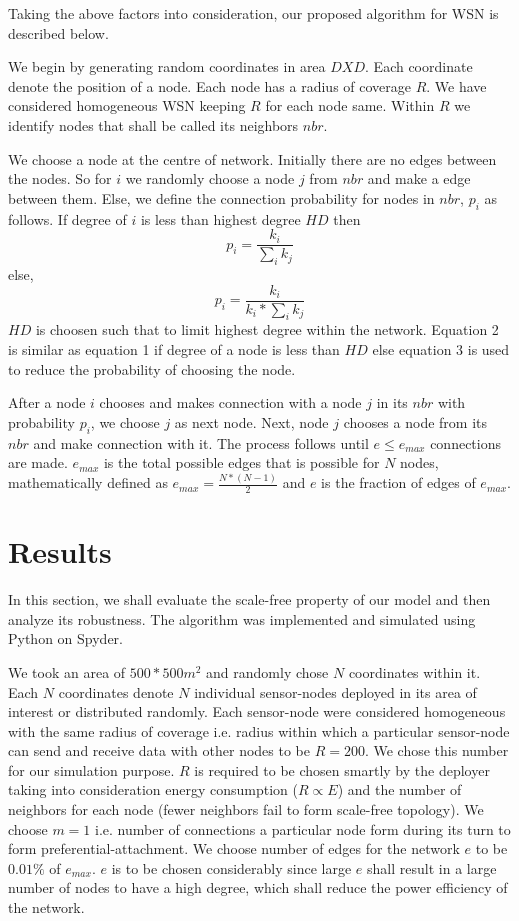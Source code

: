 \documentclass{article}
\begin{document}
	Taking the above factors into consideration, our proposed algorithm for WSN is described below.
	
	We begin by generating random coordinates in area $DXD$. Each coordinate denote the position of a node. Each node has a radius of coverage $R$. We have considered homogeneous WSN keeping $R$ for each node same. Within $R$ we identify nodes that shall be called its neighbors $nbr$. 
	
	We choose a node at the centre of network. Initially there are no edges between the nodes. So for $i$ we randomly choose a node $j$ from $nbr$ and make a edge between them. Else, we define the connection probability for nodes in $nbr$, $p_i$ as follows. If degree of $i$ is less than highest degree $HD$ then \begin{equation} p_i = \frac{k_i}{\sum_i{k_j}}\end{equation} else, \begin{equation}p_i = \frac{k_i}{k_i*\sum_i{k_j}}\end{equation} $HD$ is choosen such that to limit highest degree within the network. Equation 2 is similar as equation 1 if degree of a node is less than $HD$ else equation 3 is used to reduce the probability of choosing the node.
	
	After a node $i$ chooses and makes connection with a node $j$ in its $nbr$ with probability $p_i$, we choose $j$ as next node. Next, node $j$ chooses a node from its $nbr$ and make connection with it. The process follows until $e \leq e_{max}$ connections are made. $e_{max}$ is the total possible edges that is possible for $N$ nodes, mathematically defined as $e_{max} =  \frac{N*(N-1)}{2}$ and $e$ is the fraction of edges of $e_{max}$.
	
	
	\section{Results}
	In this section, we shall evaluate the scale-free property of our model and then analyze its robustness. The algorithm was implemented and simulated using Python on Spyder.
	
	We took an area of $500*500 m^2$ and randomly chose $N$ coordinates within it. Each $N$ coordinates denote $N$ individual sensor-nodes deployed in its area of interest or distributed randomly. Each sensor-node were considered homogeneous with the same radius of coverage i.e. radius within which a particular sensor-node can send and receive data with other nodes to be $R=200$. We chose this number for our simulation purpose. $R$ is required to be chosen smartly by the deployer taking into consideration energy consumption ($R\propto E$) and the number of neighbors for each node (fewer neighbors fail to form scale-free topology). We choose $m=1$ i.e. number of connections a particular node form during its turn to form preferential-attachment. We choose number of edges for the network $e$ to be $0.01\%$ of $e_{max}$. $e$ is to be chosen considerably since large $e$ shall result in a large number of nodes to have a high degree, which shall reduce the power efficiency of the network.
	
\end{document}

